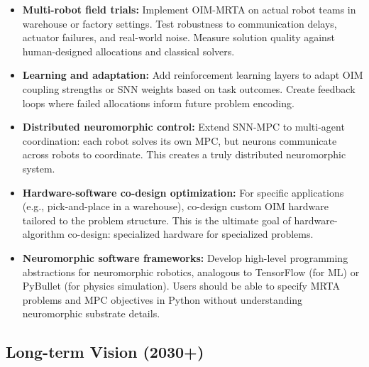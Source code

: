 \begin{itemize}
\item \textbf{Multi-robot field trials:} Implement OIM-MRTA on actual robot teams in warehouse or factory settings. Test robustness to communication delays, actuator failures, and real-world noise. Measure solution quality against human-designed allocations and classical solvers.

\item \textbf{Learning and adaptation:} Add reinforcement learning layers to adapt OIM coupling strengths or SNN weights based on task outcomes. Create feedback loops where failed allocations inform future problem encoding.

\item \textbf{Distributed neuromorphic control:} Extend SNN-MPC to multi-agent coordination: each robot solves its own MPC, but neurons communicate across robots to coordinate. This creates a truly distributed neuromorphic system.

\item \textbf{Hardware-software co-design optimization:} For specific applications (e.g., pick-and-place in a warehouse), co-design custom OIM hardware tailored to the problem structure. This is the ultimate goal of hardware-algorithm co-design: specialized hardware for specialized problems.

\item \textbf{Neuromorphic software frameworks:} Develop high-level programming abstractions for neuromorphic robotics, analogous to TensorFlow (for ML) or PyBullet (for physics simulation). Users should be able to specify MRTA problems and MPC objectives in Python without understanding neuromorphic substrate details.
\end{itemize}

\subsection{Long-term Vision (2030+)}

